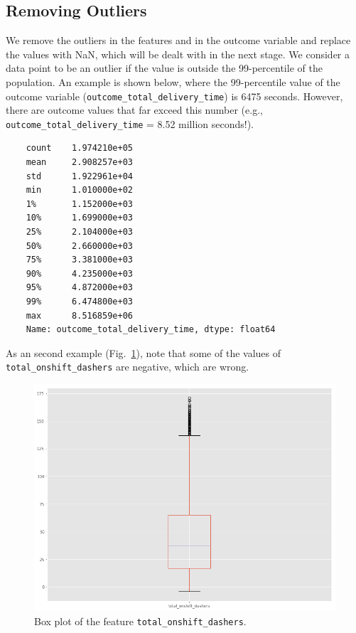 \documentclass[12pt]{article}
\begin{document}
\subsection{Removing Outliers}

We remove the outliers in the features and in the outcome variable and replace the values with NaN, which will be dealt with in the next stage. We consider a data point to be an outlier if the value is outside the 99-percentile of the population. An example is shown below, where the 99-percentile value of the outcome variable (\texttt{outcome\_total\_delivery\_time}) is 6475 seconds. However, there are outcome values that far exceed this number (e.g., \texttt{outcome\_total\_delivery\_time} = 8.52 million seconds!).


\begin{verbatim}
    count    1.974210e+05
    mean     2.908257e+03
    std      1.922961e+04
    min      1.010000e+02
    1%       1.152000e+03
    10%      1.699000e+03
    25%      2.104000e+03
    50%      2.660000e+03
    75%      3.381000e+03
    90%      4.235000e+03
    95%      4.872000e+03
    99%      6.474800e+03
    max      8.516859e+06
    Name: outcome_total_delivery_time, dtype: float64
\end{verbatim}

As an second example (Fig.~\ref{fig:total_onshift_dashers}), note that some of the values of \texttt{total\_onshift\_dashers} are negative, which are wrong.

\begin{figure}[H]
\centering
\includegraphics[width=6in]{graphics/total_onshift_dashers.png}
\caption{Box plot of the feature \texttt{total\_onshift\_dashers}.}
\label{fig:total_onshift_dashers}
\end{figure}
\end{document}

